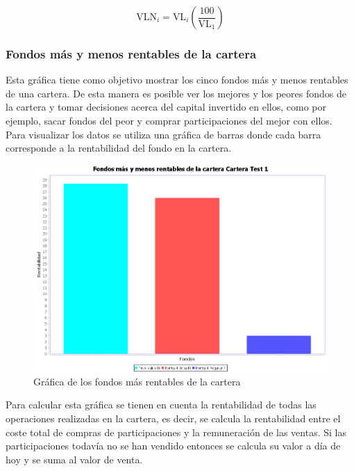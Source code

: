 \documentclass[12pt, a4paper]{article}
\begin{document}
\begin{equation}
\text{VLN}_i=\text{VL}_i\left(\frac{100}{\text{VL}_1}\right)
\end{equation}

	\newpage

\subsubsection{Fondos más y menos rentables de la cartera}

Esta gráfica tiene como objetivo mostrar los cinco fondos más y menos rentables de una cartera. De esta manera es posible ver los mejores y los peores fondos de la cartera y tomar decisiones acerca del capital invertido en ellos, como por ejemplo, sacar fondos del peor y comprar participaciones del mejor con ellos. \\

Para visualizar los datos se utiliza una gráfica de barras donde cada barra corresponde a la rentabilidad del fondo en la cartera.\\


	\begin{figure}[htbp]
	\centering
	\includegraphics[width=\textwidth]{figuras/masrentables.PNG}
	\caption{Gráfica de los fondos más rentables de la cartera}
	\label{fig:masrentables}
	\end {figure}
	
Para calcular esta gráfica se tienen en cuenta la rentabilidad de todas las operaciones realizadas en la cartera, es decir, se calcula la rentabilidad entre el coste total de compras de participaciones y la remuneración de las ventas. Si las participaciones todavía no se han vendido entonces se calcula su valor a día de hoy y se suma al valor de venta.\\
\end{document}
